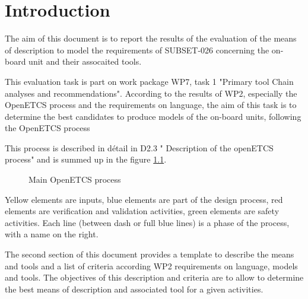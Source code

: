 

\chapter{Introduction}


The aim of this document is to report the results of the evaluation of the means of description to model the requirements of SUBSET-026 concerning the on-board unit and their assocaited tools.

This evaluation task is part on work package WP7, task 1  "Primary tool Chain analyses and recommendations". According to the results of WP2, especially the OpenETCS process and the requirements on language, the aim of this task is to determine the best candidates to  produce models of the on-board units, following the OpenETCS process

This process is described in détail in D2.3 " Description of the openETCS process" and is summed up in the figure \ref{fig:main_process}.
 

 \begin{figure}
  \centering
  \caption{Main OpenETCS process}
  \label{fig:main_process}
\end{figure}

Yellow elements are inputs, blue elements are part of the design process, red elements are verification and validation activities, green elements are safety activities. Each line (between dash or full blue lines) is a phase of the process, with a name on the right. 

The second section of this document provides a template to describe the means and tools and a list of criteria according WP2 requirements on language, models and tools. The objectives of this description and criteria are to allow to determine the best means of description and associated tool for a given activities.

